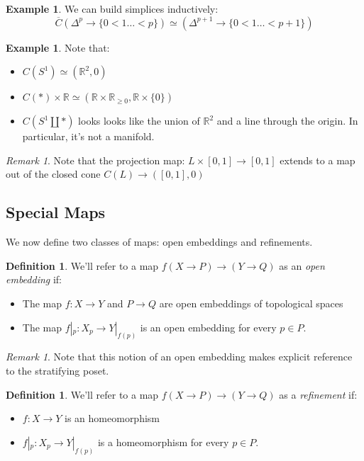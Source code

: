 \documentclass[11pt,reqno]{amsart}
\theoremstyle{plain}
\numberwithin{equation}{section}
\theoremstyle{remark}
\newtheorem{rek}[thm]{Remark}
\theoremstyle{definition}
\newtheorem{defi}[thm]{Definition}
\newtheorem{ex}[thm]{Example}
\newcommand{\R}{\mathbb{R}}
\begin{document}
\begin{ex}
We can build simplices inductively: 
$$
\overline{C}(\Delta^p \rightarrow \{0 < 1 \dots <p \}) \simeq (\Delta^{p+1} \rightarrow \{0 < 1 \dots < p+1 \})
$$
\end{ex}

\begin{ex}
Note that:
\begin{itemize}
\item $C(S^1) \simeq (\R^2, 0)$
\item $C(*)\times \R \simeq (\R \times \R_{\geq 0}, \R \times \{0\})$
\item $C( S^1 \amalg *)$ looks looks like the union of $\R^2$ and a line through the origin. In particular, it's not a manifold. 
\end{itemize}
\end{ex}

\begin{rek}
Note that the projection map: $L\times [0, 1] \rightarrow [0, 1]$ extends to a map out of the closed cone $C(L)\rightarrow ([0, 1], 0)$
\end{rek}



\subsection{Special Maps}

We now define two classes of maps: open embeddings and refinements. 

\begin{defi}
We'll refer to a map $f (X\rightarrow P) \rightarrow (Y \rightarrow Q)$ as an \textit{open embedding} if:
\begin{itemize}
\item The map $f: X \rightarrow Y$ and $P\rightarrow Q$ are open embeddings of topological spaces
\item The map $f|_p: X_p \rightarrow Y|_{f(p)}$ is an open embedding for every $p \in P$.
\end{itemize}
\end{defi}

\begin{rek}
Note that this notion of an open embedding makes explicit reference to the stratifying poset. 
\end{rek}

\begin{defi}
We'll refer to a map $f (X\rightarrow P) \rightarrow (Y \rightarrow Q)$ as a \textit{refinement} if: 
\begin{itemize}
\item $f: X \rightarrow Y$ is an homeomorphism
\item $f|_p: X_p \rightarrow Y|_{f(p)}$ is a homeomorphism for every $p \in P$.
\end{itemize}
\end{defi}
\end{document}
